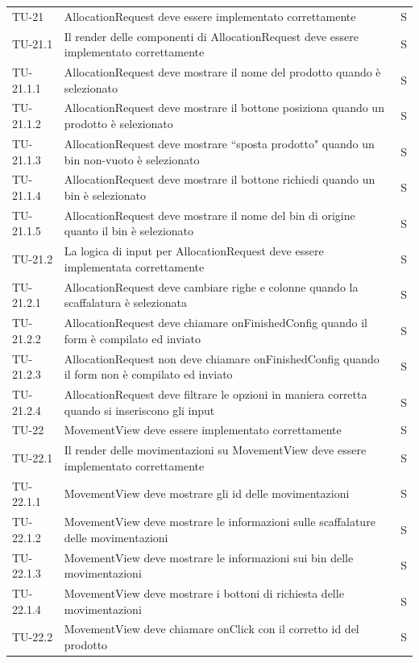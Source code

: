 \begin{xltabular}{0.9\textwidth}{X | p{0.6\textwidth} | p{0.1\textwidth} }
    TU-21 & AllocationRequest deve essere implementato correttamente & S\\
    TU-21.1 & Il render delle componenti di AllocationRequest deve essere implementato correttamente & S\\
    TU-21.1.1 & AllocationRequest deve mostrare il nome del prodotto quando è selezionato & S\\ 
    TU-21.1.2 & AllocationRequest deve mostrare il bottone posiziona quando un prodotto è selezionato & S\\ 
    TU-21.1.3 & AllocationRequest deve mostrare ``sposta prodotto" quando un bin non-vuoto è selezionato & S\\ 
    TU-21.1.4 & AllocationRequest deve mostrare il bottone richiedi quando un bin è selezionato & S\\ 
    TU-21.1.5 & AllocationRequest deve mostrare il nome del bin di origine quanto il bin è selezionato & S\\ 
    TU-21.2 & La logica di input per AllocationRequest deve essere implementata correttamente & S\\
    TU-21.2.1 & AllocationRequest deve cambiare righe e colonne quando la scaffalatura è selezionata & S\\
    TU-21.2.2 & AllocationRequest deve chiamare onFinishedConfig quando il form è compilato ed inviato & S\\
    TU-21.2.3 & AllocationRequest non deve chiamare onFinishedConfig quando il form non è compilato ed inviato & S\\
    TU-21.2.4 & AllocationRequest deve filtrare le opzioni in maniera corretta quando si inseriscono gli input & S\\

    TU-22 & MovementView deve essere implementato correttamente & S\\
    TU-22.1 & Il render delle movimentazioni su MovementView deve essere implementato correttamente & S\\
    TU-22.1.1 & MovementView deve mostrare gli id delle movimentazioni & S\\
    TU-22.1.2 & MovementView deve mostrare le informazioni sulle scaffalature delle movimentazioni & S\\
    TU-22.1.3 & MovementView deve mostrare le informazioni sui bin delle movimentazioni & S\\
    TU-22.1.4 & MovementView deve mostrare i bottoni di richiesta delle movimentazioni & S\\
    TU-22.2 & MovementView deve chiamare onClick con il corretto id del prodotto & S\\
\end{xltabular}

